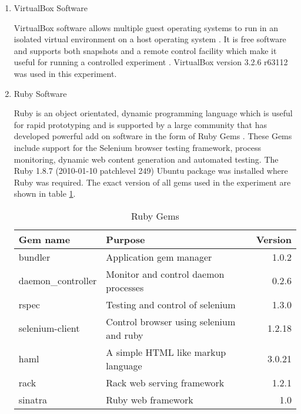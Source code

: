 \begin{enumerate}
  \item VirtualBox Software

  VirtualBox software allows multiple guest operating systems to run in an
  isolated virtual environment on a host operating system \parencite{:fk}.
  It is free software and supports both snapshots and a remote control facility
  which make it useful for running a controlled experiment \parencite{Oracle:2011kx}.
  VirtualBox version 3.2.6 r63112 was used in this experiment.

  \item Ruby Software

  Ruby is an object orientated, dynamic programming language which is useful for
  rapid prototyping and is supported by a large community that has developed
  powerful add on software in the form of Ruby Gems \parencite{:2010uq}. These
  Gems include support for the Selenium browser testing framework, process
  monitoring, dynamic web content generation and automated testing. The Ruby
  1.8.7 (2010-01-10 patchlevel 249) Ubuntu package was installed where Ruby was
  required. The exact version of all gems used in the experiment are shown in
  table \ref{table:gems}.

  \begin{center}
    \begin{minipage}[t]{\linewidth}
      \begin{table}[H]
        \begin{tabular}{llr}
          \toprule
          Gem name & Purpose & Version \\
          \midrule
          bundler & Application gem manager & 1.0.2 \\
          daemon\_controller & Monitor and control daemon processes & 0.2.6 \\
          rspec & Testing and control of selenium & 1.3.0 \\
          selenium-client & Control browser using selenium and ruby & 1.2.18 \\
          haml & A simple HTML like markup language & 3.0.21 \\
          rack & Rack web serving framework & 1.2.1 \\
          sinatra & Ruby web framework & 1.0 \\
          \bottomrule
        \end{tabular}
        \caption{Ruby Gems}
        \label{table:gems}
      \end{table}
    \end{minipage}
  \end{center}


\end{enumerate}
